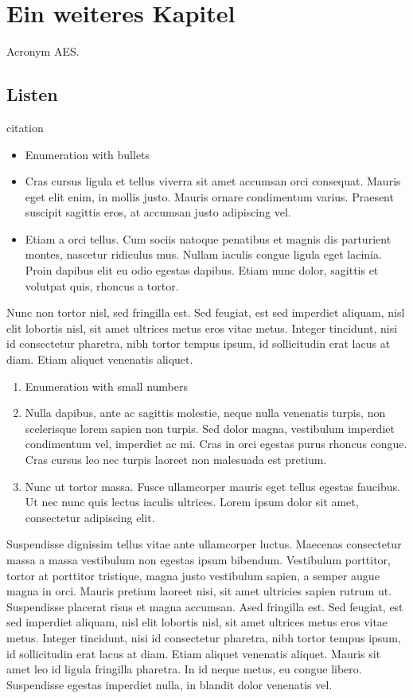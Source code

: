 \chapter{Ein weiteres Kapitel}
\label{ch:chapter03}

Acronym \acf{AES}. 

%
%
\section{Listen}
\label{sec:chapter03:listen}
citation \cite{RANDOM-1998}

\begin{itemize}
 \item Enumeration with bullets
 \item Cras cursus ligula et tellus viverra sit amet accumsan orci consequat. Mauris eget elit enim, in mollis justo. Mauris ornare condimentum varius. Praesent suscipit sagittis eros, at accumsan justo adipiscing vel.
 \item Etiam a orci tellus. Cum sociis natoque penatibus et magnis dis parturient montes, nascetur ridiculus mus. Nullam iaculis congue ligula eget lacinia. Proin dapibus elit eu odio egestas dapibus. Etiam nunc dolor, sagittis et volutpat quis, rhoncus a tortor.
\end{itemize}

Nunc non tortor nisl, sed fringilla est. Sed feugiat, est sed imperdiet aliquam, nisl elit lobortis nisl, sit amet ultrices metus eros vitae metus. Integer tincidunt, nisi id consectetur pharetra, nibh tortor tempus ipsum, id sollicitudin erat lacus at diam. Etiam aliquet venenatis aliquet.

\begin{enumerate}
 \item Enumeration with small numbers
 \item Nulla dapibus, ante ac sagittis molestie, neque nulla venenatis turpis, non scelerisque lorem sapien non turpis. Sed dolor magna, vestibulum imperdiet condimentum vel, imperdiet ac mi. Cras in orci egestas purus rhoncus congue. Cras cursus leo nec turpis laoreet non malesuada est pretium.
 \item Nunc ut tortor massa. Fusce ullamcorper mauris eget tellus egestas faucibus. Ut nec nunc quis lectus iaculis ultrices. Lorem ipsum dolor sit amet, consectetur adipiscing elit.
\end{enumerate}

Suspendisse dignissim tellus vitae ante ullamcorper luctus. Maecenas consectetur massa a massa vestibulum non egestas ipsum bibendum. Vestibulum porttitor, tortor at porttitor tristique, magna justo vestibulum sapien, a semper augue magna in orci. Mauris pretium laoreet nisi, sit amet ultricies sapien rutrum ut. Suspendisse placerat risus et magna accumsan. Ased fringilla est. Sed feugiat, est sed imperdiet aliquam, nisl elit lobortis nisl, sit amet ultrices metus eros vitae metus. Integer tincidunt, nisi id consectetur pharetra, nibh tortor tempus ipsum, id sollicitudin erat lacus at diam. Etiam aliquet venenatis aliquet. Mauris sit amet leo id ligula fringilla pharetra. In id neque metus, eu congue libero. Suspendisse egestas imperdiet nulla, in blandit dolor venenatis vel.

